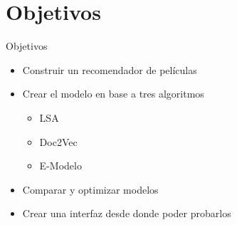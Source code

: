 \documentclass{beamer}
\begin{document}
  \section{Objetivos}
  \begin{frame}{Objetivos}
      \begin{itemize}
          \item Construir un recomendador de películas
          \item Crear el modelo en base a tres algoritmos
              \begin{itemize}
                  \item LSA
                  \item Doc2Vec
                  \item E-Modelo
              \end{itemize}
          \item Comparar y optimizar modelos
          \item Crear una interfaz desde donde poder probarlos
      \end{itemize}
  \end{frame}
\end{document}
